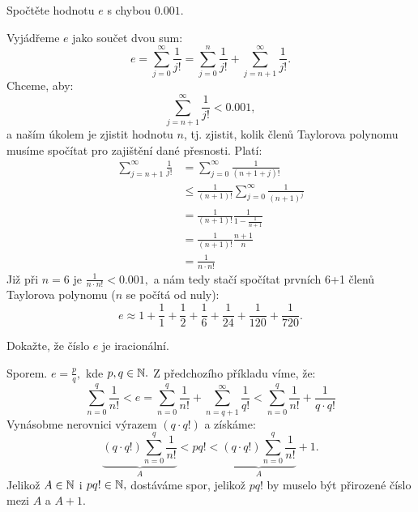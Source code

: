 \begin{example}
    Spočtěte hodnotu $e$ s chybou $0.001.$

    Vyjádřeme $e$ jako součet dvou sum:
    $$e = \sum_{j=0}^\infty \frac{1}{j!} = \sum_{j=0}^n \frac{1}{j!} + \sum_{j=n+1}^\infty \frac{1}{j!}.$$
    Chceme, aby:
    $$\sum_{j=n+1}^\infty \frac{1}{j!} < 0.001,$$
    a naším úkolem je zjistit hodnotu $n$, tj. zjistit, kolik členů Taylorova
    polynomu musíme spočítat pro zajištění dané přesnosti. Platí:
    \begin{align*}
        \sum_{j=n+1}^\infty \frac{1}{j!}
        &= \sum_{j=0}^\infty \frac{1}{(n+1+j)!} \\
        &\leq \frac{1}{(n+1)!}\sum_{j=0}^\infty \frac{1}{(n+1)^j}
            \tag{$(n+1+j)! \geq (n+1)!(n+1)^j$} \\
        &= \frac{1}{(n+1)!} \frac{1}{1 - \frac{1}{n+1}} 
            \tag{součtový vzorec geometrické řady}\\
        &= \frac{1}{(n+1)!} \frac{n+1}{n} \\
        &= \frac{1}{n\cdot n!}
    \end{align*}
    Již při $n = 6$ je $\frac{1}{n\cdot n!} < 0.001,$ a nám tedy stačí 
    spočítat prvních 6+1 členů Taylorova polynomu ($n$ se počítá od nuly):
    $$e \approx 1 + \frac{1}{1} + \frac{1}{2} + \frac{1}{6} + \frac{1}{24} + 
    \frac{1}{120} + \frac{1}{720}.$$
\end{example}

\begin{example}
    Dokažte, že číslo $e$ je iracionální.

    Sporem. \Necht $e = \frac{p}{q},$ kde $p,q \in \mathbb{N}.$ Z předchozího příkladu víme,
    že:
    $$\sum_{n=0}^q \frac{1}{n!} < e = \sum_{n=0}^q \frac{1}{n!} 
    + \sum_{n=q+1}^\infty \frac{1}{q!} < \sum_{n=0}^q\frac{1}{n!} + \frac{1}{q\cdot q!}$$
    Vynásobme nerovnici výrazem $(q\cdot q!)$ a získáme:
    $$\underbrace{(q\cdot q!)\sum_{n=0}^q \frac{1}{n!}}_{A} 
    < pq!
    < \underbrace{(q\cdot q!) \sum_{n=0}^q \frac{1}{n!}}_{A} + 1.$$
    Jelikož $A \in \mathbb{N}$ i $pq! \in \mathbb{N},$ dostáváme spor, jelikož 
    $pq!$ by muselo být přirozené číslo mezi $A$ a $A+1.$
\end{example}


